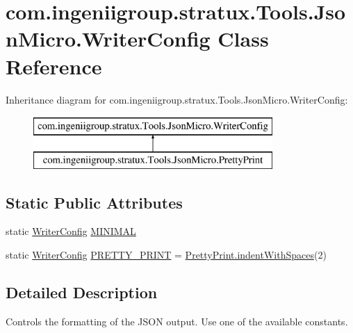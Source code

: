 \hypertarget{classcom_1_1ingeniigroup_1_1stratux_1_1_tools_1_1_json_micro_1_1_writer_config}{}\section{com.\+ingeniigroup.\+stratux.\+Tools.\+Json\+Micro.\+Writer\+Config Class Reference}
\label{classcom_1_1ingeniigroup_1_1stratux_1_1_tools_1_1_json_micro_1_1_writer_config}
Inheritance diagram for com.\+ingeniigroup.\+stratux.\+Tools.\+Json\+Micro.\+Writer\+Config\+:\begin{figure}[H]
\begin{center}
\leavevmode
\includegraphics[height=2.000000cm]{classcom_1_1ingeniigroup_1_1stratux_1_1_tools_1_1_json_micro_1_1_writer_config}
\end{center}
\end{figure}
\subsection*{Static Public Attributes}
\begin{DoxyCompactItemize}
\item 
static \hyperlink{classcom_1_1ingeniigroup_1_1stratux_1_1_tools_1_1_json_micro_1_1_writer_config}{Writer\+Config} \hyperlink{classcom_1_1ingeniigroup_1_1stratux_1_1_tools_1_1_json_micro_1_1_writer_config_acbe1131a47b5eb8d820e2dcf510eb094}{M\+I\+N\+I\+M\+AL}
\item 
static \hyperlink{classcom_1_1ingeniigroup_1_1stratux_1_1_tools_1_1_json_micro_1_1_writer_config}{Writer\+Config} \hyperlink{classcom_1_1ingeniigroup_1_1stratux_1_1_tools_1_1_json_micro_1_1_writer_config_a5c3039548293a626942b43322b47dc3c}{P\+R\+E\+T\+T\+Y\+\_\+\+P\+R\+I\+NT} = \hyperlink{classcom_1_1ingeniigroup_1_1stratux_1_1_tools_1_1_json_micro_1_1_pretty_print_a3a475018a91dd9eb940b4890b83ac4cf}{Pretty\+Print.\+indent\+With\+Spaces}(2)
\end{DoxyCompactItemize}


\subsection{Detailed Description}
Controls the formatting of the J\+S\+ON output. Use one of the available constants. 

